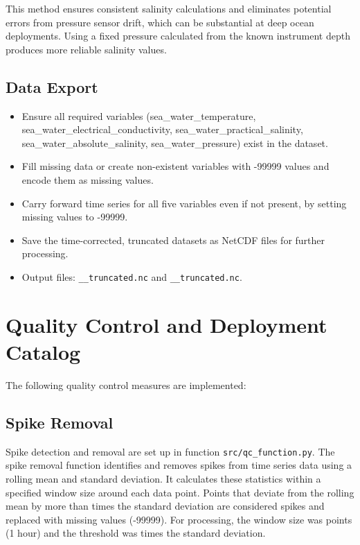 This method ensures consistent salinity calculations and eliminates potential errors from pressure sensor drift, 
which can be substantial at deep ocean deployments. 
Using a fixed pressure calculated from the known instrument depth produces more reliable salinity values.

\subsection{Data Export}

\begin{itemize}
\item Ensure all required variables (sea\_water\_temperature, sea\_water\_electrical\_conductivity, sea\_water\_practical\_salinity, sea\_water\_absolute\_salinity, sea\_water\_pressure) exist in the dataset.
\item Fill missing data or create non-existent variables with -99999 values and encode them as missing values.
\item Carry forward time series for all five variables even if not present, by setting missing values to -99999.
\item Save the time-corrected, truncated datasets as NetCDF files for further processing.
\item Output files: 
\texttt{\projectname\casenumber\_\FirstInstrument\_truncated.nc}
and \texttt{\projectname\casenumber\_\SecondInstrument\_truncated.nc}.
\end{itemize}


\section{Quality Control and Deployment Catalog}
The following quality control measures are implemented:

\subsection{Spike Removal}
Spike detection and removal are set up in function \texttt{src/qc\_function.py}. 
The spike removal function identifies and removes spikes from time series data using a rolling mean and standard deviation. 
It calculates these statistics within a specified window size around each data point. 
Points that deviate from the rolling mean by more than \ThresholdValue{} times the standard deviation are considered spikes and replaced with missing values (-99999). 
For \projectname{} \casenumber{} processing, the window size was \WindowSize{} points (1 hour) and the threshold was \ThresholdValue{} times the standard deviation.


